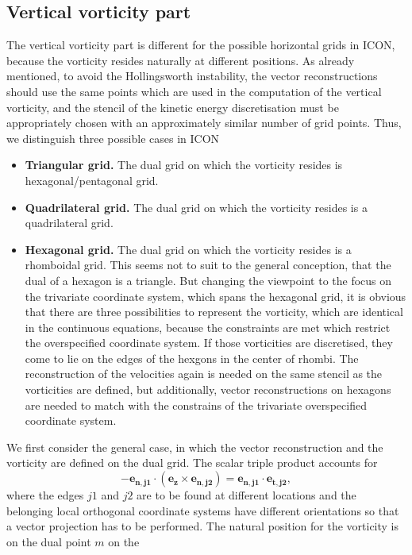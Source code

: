 \subsection{Vertical vorticity part}
The vertical vorticity part is different for the possible horizontal grids in ICON, because
the vorticity resides naturally at different positions. As already mentioned, to avoid the
Hollingsworth instability, the vector reconstructions should use the same points which are
used in the computation of the vertical vorticity, and the stencil of the kinetic
energy discretisation must be appropriately chosen with an approximately similar number of
grid points. Thus, we distinguish three possible cases in ICON
\begin{itemize}
\item{\bfseries Triangular grid.} The dual grid on which the vorticity resides is hexagonal/pentagonal grid.
\item{\bfseries Quadrilateral grid.} The dual grid on which the vorticity resides is a quadrilateral grid.
\item{\bfseries Hexagonal grid.} The dual grid on which the vorticity resides is a rhomboidal grid. This seems not to suit to the general conception, that the dual of a
hexagon is a triangle. But changing the viewpoint to the focus on the trivariate coordinate
system, which spans the hexagonal grid, it is obvious that there are three possibilities
to represent the vorticity, which are identical in the continuous equations, because the
constraints are met which restrict the overspecified coordinate system. If those vorticities
are discretised, they come to lie on the edges of the hexgons in the center of rhombi.
The reconstruction of the velocities again is needed on the same stencil as the vorticities
are defined, but additionally, vector reconstructions on hexagons are needed to match with
the constrains of the trivariate overspecified coordinate system.
\end{itemize}
We first consider the general case, in which the vector reconstruction and the vorticity
are defined on the dual grid. The scalar triple product accounts for
\begin{displaymath}
 -\mathbf{e_{n,j1}}\cdot(\mathbf{e_z}\times\mathbf{e_{n,j2}})=
  \mathbf{e_{n,j1}}\cdot\mathbf{e_{t,j2}},
\end{displaymath}
where the edges $j1$ and $j2$ are to be found at different locations and the belonging
local orthogonal coordinate systems have different orientations so that a vector projection
has to be performed. The natural position for the vorticity is on the dual point $m$ on the
